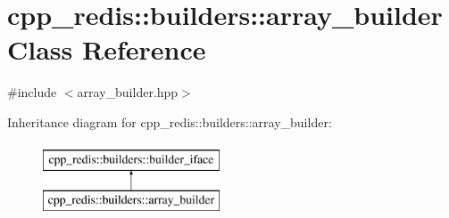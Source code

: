 \hypertarget{classcpp__redis_1_1builders_1_1array__builder}{}\section{cpp\+\_\+redis\+:\+:builders\+:\+:array\+\_\+builder Class Reference}
\label{classcpp__redis_1_1builders_1_1array__builder}


{\ttfamily \#include $<$array\+\_\+builder.\+hpp$>$}

Inheritance diagram for cpp\+\_\+redis\+:\+:builders\+:\+:array\+\_\+builder\+:\begin{figure}[H]
\begin{center}
\leavevmode
\includegraphics[height=2.000000cm]{classcpp__redis_1_1builders_1_1array__builder}
\end{center}
\end{figure}
